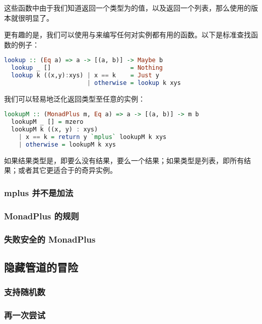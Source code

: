 \documentclass[./main.tex]{subfiles}
\begin{document}
这些函数中由于我们知道返回一个类型为的值，以及返回一个列表，那么使用的版本就很明显了。

更有趣的是，我们可以使用与来编写任何对实例都有用的函数。以下是标准查找函数的例子：

\begin{lstlisting}[language=Haskell]
  lookup :: (Eq a) => a -> [(a, b)] -> Maybe b
  lookup _ []                      = Nothing
  lookup k ((x,y):xys) | x == k    = Just y
                       | otherwise = lookup k xys
\end{lstlisting}

我们可以轻易地泛化返回类型至任意的实例：

\begin{lstlisting}[language=Haskell]
  lookupM :: (MonadPlus m, Eq a) => a -> [(a, b)] -> m b
  lookupM _ [] = mzero
  lookupM k ((x, y) : xys)
    | x == k = return y `mplus` lookupM k xys
    | otherwise = lookupM k xys
\end{lstlisting}

如果结果类型是，即要么没有结果，要么一个结果；如果类型是列表，即所有结果；或者其它更适合于的奇异实例。

\subsubsection*{mplus 并不是加法}

\subsubsection*{MonadPlus 的规则}

\subsubsection*{失败安全的 MonadPlus}

\subsection*{隐藏管道的冒险}

\subsubsection*{支持随机数}

\subsubsection*{再一次尝试}
\end{document}
